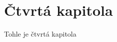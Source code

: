 \hypertarget{ux10dtvrtuxe1-kapitola}{%
\chapter{Čtvrtá kapitola}\label{ux10dtvrtuxe1-kapitola}}

Tohle je čtvrtá kapitola~\parencite{Broucek2017}
